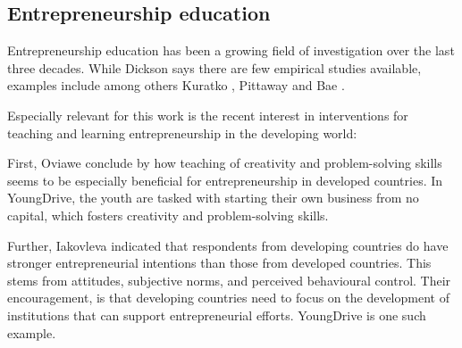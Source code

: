 \subsection{Entrepreneurship education}

%

%




Entrepreneurship education has been a growing field of investigation over the last three decades. While Dickson \citep{dickson} says there are few empirical studies available, examples include among others Kuratko \citep{kuratko}, Pittaway \citep{pittaway} and Bae \citep{bae}.

Especially relevant for this work is the recent interest in interventions for teaching and learning entrepreneurship in the developing world: \citep{oviawe} \citep{iakovleva}



First, Oviawe \citep{oviawe} conclude by how teaching of creativity and problem-solving skills seems to be especially beneficial for entrepreneurship in developed countries. In YoungDrive, the youth are tasked with starting their own business from no capital, which fosters creativity and problem-solving skills.

Further, Iakovleva \citep{iakovleva} indicated that respondents from developing countries do have stronger entrepreneurial intentions than those from developed countries. This stems from attitudes, subjective norms, and perceived behavioural control. Their encouragement, is that developing countries need to focus on the development of institutions that
can support entrepreneurial efforts. YoungDrive is one such example.


